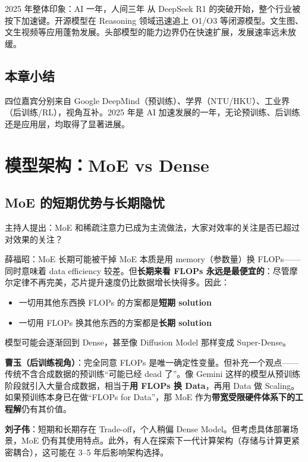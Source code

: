 \documentclass[a4paper]{article}
\begin{document}
\begin{importantbox}{2025 年整体印象：AI 一年，人间三年}
从 DeepSeek R1 的突破开始，整个行业被按下加速键。开源模型在 Reasoning 领域迅速追上 O1/O3 等闭源模型。文生图、文生视频等应用蓬勃发展。头部模型的能力边界仍在快速扩展，发展速率远未放缓。
\end{importantbox}

\subsection{本章小结}
四位嘉宾分别来自 Google DeepMind（预训练）、学界（NTU/HKU）、工业界（后训练/RL），视角互补。2025 年是 AI 加速发展的一年，无论预训练、后训练还是应用层，均取得了显著进展。

\section{模型架构：MoE vs Dense}

\subsection{MoE 的短期优势与长期隐忧}

主持人提出：MoE 和稀疏注意力已成为主流做法，大家对效率的关注是否已超过对效果的关注？

\begin{importantbox}{薛福昭：MoE 长期可能被干掉}
MoE 本质是用 memory（参数量）换 FLOPs——同时意味着 data efficiency 较差。但\textbf{长期来看 FLOPs 永远是最便宜的}：尽管摩尔定律不再完美，芯片提升速度仍比数据增长快得多。因此：
\begin{itemize}
  \item 一切用其他东西换 FLOPs 的方案都是\textbf{短期 solution}
  \item 一切用 FLOPs 换其他东西的方案都是\textbf{长期 solution}
\end{itemize}
模型可能会逐渐回到 Dense，甚至像 Diffusion Model 那样变成 Super-Dense。
\end{importantbox}

\textbf{曹玉（后训练视角）}：完全同意 FLOPs 是唯一确定性变量。但补充一个观点——传统不含合成数据的预训练``可能已经 dead 了''。像 Gemini 这样的模型从预训练阶段就引入大量合成数据，相当于\textbf{用 FLOPs 换 Data}，再用 Data 做 Scaling。如果预训练本身已在做``FLOPs for Data''，那 MoE 作为\textbf{带宽受限硬件体系下的工程解}仍有其价值。

\textbf{刘子伟}：短期和长期存在 Trade-off，个人稍偏 Dense Model。但考虑具体部署场景，MoE 仍有其使用特点。此外，有人在探索下一代计算架构（存储与计算更紧密耦合），这可能在 3--5 年后影响架构选择。
\end{document}
